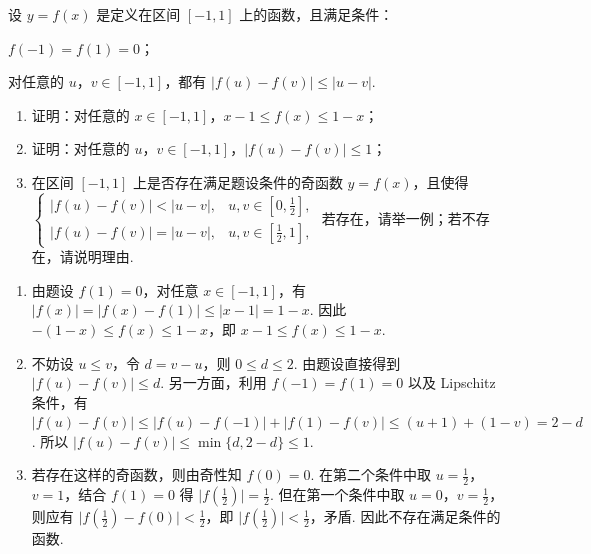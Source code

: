 \begin{problem}
设 \(y=f(x)\) 是定义在区间 \([-1,1]\) 上的函数，且满足条件：
\begin{circlelist}
\item \(f(-1)=f(1)=0\)；
\item 对任意的 \(u\)，\(v\in[-1,1]\)，都有 \(|f(u)-f(v)|\leqslant |u-v|\).
\end{circlelist}
\begin{enumerate}
\item 证明：对任意的 \(x\in[-1,1]\)，\(x-1\leqslant f(x)\leqslant 1-x\)；
\item 证明：对任意的 \(u\)，\(v\in[-1,1]\)，\(|f(u)-f(v)|\leqslant 1\)；
\item 在区间 \([-1,1]\) 上是否存在满足题设条件的奇函数 \(y=f(x)\)，且使得 \(\begin{cases}
|f(u)-f(v)|<|u-v|, & u,v\in\left[0,\frac12\right],\\
|f(u)-f(v)|=|u-v|, & u,v\in\left[\frac12,1\right],
\end{cases}\) 若存在，请举一例；若不存在，请说明理由.
\end{enumerate}

\begin{solution}
\begin{enumerate}
\item 由题设 \(f(1)=0\)，对任意 \(x\in[-1,1]\)，有 \(\lvert f(x)\rvert=\lvert f(x)-f(1)\rvert\leqslant\lvert x-1\rvert=1-x\). 因此 \(-(1-x)\leq f(x)\leq1-x\)，即 \(x-1\leq f(x)\leq1-x\).
\item 不妨设 \(u\leq v\)，令 \(d=v-u\)，则 \(0\leq d\leq2\). 由题设直接得到 \(\lvert f(u)-f(v)\rvert\leq d\). 另一方面，利用 \(f(-1)=f(1)=0\) 以及 Lipschitz 条件，有 \(\lvert f(u)-f(v)\rvert\leq\lvert f(u)-f(-1)\rvert+\lvert f(1)-f(v)\rvert\leq(u+1)+(1-v)=2-d\). 所以 \(\lvert f(u)-f(v)\rvert\leq\min\{d,2-d\}\leq1\).
\item 若存在这样的奇函数，则由奇性知 \(f(0)=0\). 在第二个条件中取 \(u=\frac12\)，\(v=1\)，结合 \(f(1)=0\) 得 \(\lvert f(\frac12)\rvert=\frac12\). 但在第一个条件中取 \(u=0\)，\(v=\frac12\)，则应有 \(\lvert f(\frac12)-f(0)\rvert<\frac12\)，即 \(\lvert f(\frac12)\rvert<\frac12\)，矛盾. 因此不存在满足条件的函数.
\end{enumerate}
\end{solution}
\end{problem}
